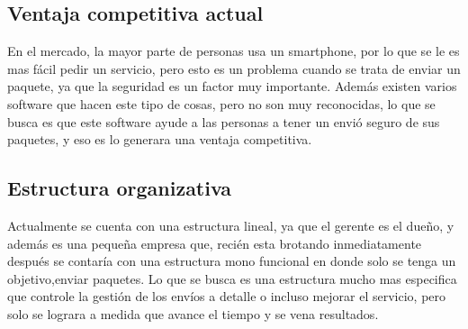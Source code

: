 \subsection{Ventaja competitiva actual}
En el mercado, la mayor parte de personas usa un smartphone, por lo que se le es mas fácil pedir un servicio, pero esto es un problema cuando se trata de enviar un paquete, ya que la seguridad es un factor muy importante. Además existen varios software que hacen este tipo de cosas, pero no son muy reconocidas, lo que se busca es que este software ayude a las personas a tener un envió seguro de sus paquetes, y eso es lo generara una ventaja competitiva. 
\subsection{Estructura organizativa}
Actualmente se cuenta con una estructura lineal, ya que el gerente es el dueño, y además es una pequeña empresa que, recién esta brotando inmediatamente después se contaría con una estructura mono funcional en donde solo se tenga un objetivo,enviar paquetes. Lo que se busca es una estructura mucho mas especifica que controle la gestión de los envíos a detalle o incluso mejorar el servicio, pero solo se lograra a medida que avance el tiempo y se vena resultados.

